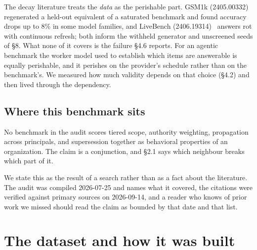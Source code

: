 \documentclass[11pt]{article}
\begin{document}
The decay literature treats the \emph{data} as the perishable part. GSM1k
(2405.00332)~\cite{gsm1k} regenerated a held-out equivalent of a saturated benchmark and
found accuracy drops up to 8\% in some model families, and LiveBench
(2406.19314)~\cite{livebench} answers rot with continuous refresh; both inform the withheld
generator and unscreened seeds of \S8. What none of it covers is the failure
\S4.6 reports. For an agentic benchmark the worker model used to establish which
items are answerable is equally perishable, and it perishes on the provider's
schedule rather than on the benchmark's. We measured how much validity depends
on that choice (\S4.2) and then lived through the dependency.

\subsection{Where this benchmark sits}

No benchmark in the audit scores tiered scope, authority weighting, propagation
across principals, and supersession together as behavioral properties of an
organization. The claim is a conjunction, and \S2.1 says which neighbour breaks
which part of it.

We state this as the result of a search rather than as a fact about the
literature. The audit was compiled 2026-07-25 and names what it covered, the
citations were verified against primary sources on 2026-09-14, and a reader who
knows of prior work we missed should read the claim as bounded by that date and
that list.

\section{The dataset and how it was built}
\end{document}
